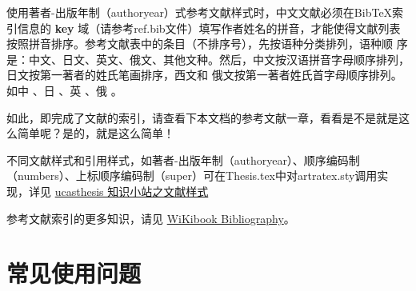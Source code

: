 使用著者-出版年制（authoryear）式参考文献样式时，中文文献必须在BibTeX索引信息的 \textbf{key} 域（请参考ref.bib文件）填写作者姓名的拼音，才能使得文献列表按照拼音排序。参考文献表中的条目（不排序号），先按语种分类排列，语种顺 序是：中文、日文、英文、俄文、其他文种。然后，中文按汉语拼音字母顺序排列，日文按第一著者的姓氏笔画排序，西文和 俄文按第一著者姓氏首字母顺序排列。如中 \citep{niu2013zonghe}、日 \citep{Bohan1928}、英 \citep{stamerjohanns2009mathml}、俄 \citep{Dubrovin1906}。

如此，即完成了文献的索引，请查看下本文档的参考文献一章，看看是不是就是这么简单呢？是的，就是这么简单！

不同文献样式和引用样式，如著者-出版年制（authoryear）、顺序编码制（numbers）、上标顺序编码制（super）可在Thesis.tex中对artratex.sty调用实现，详见 \href{https://github.com/mohuangrui/ucasthesis/wiki}{ucasthesis 知识小站之文献样式}


参考文献索引的更多知识，请见 \href{https://en.wikibooks.org/wiki/LaTeX/Bibliography_Management}{WiKibook Bibliography}。\nocite{*}%

\section{常见使用问题}\label{sec:qa}

